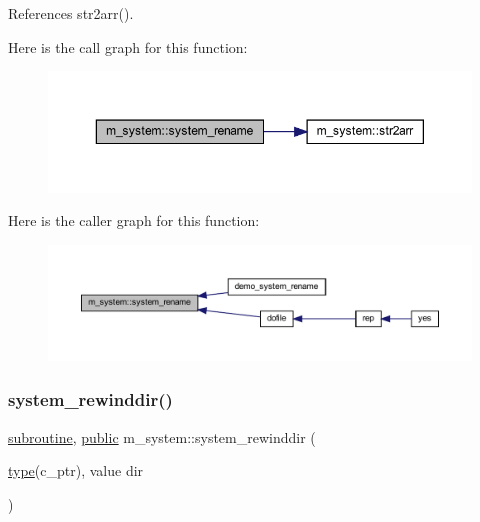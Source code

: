 References str2arr().

Here is the call graph for this function\+:
\nopagebreak
\begin{figure}[H]
\begin{center}
\leavevmode
\includegraphics[width=350pt]{namespacem__system_adfbaf3d17790da9ba0c520683d5b8003_cgraph}
\end{center}
\end{figure}
Here is the caller graph for this function\+:
\nopagebreak
\begin{figure}[H]
\begin{center}
\leavevmode
\includegraphics[width=350pt]{namespacem__system_adfbaf3d17790da9ba0c520683d5b8003_icgraph}
\end{center}
\end{figure}
\mbox{\label{namespacem__system_a3ffe757195ade8052e8acabd196ee3ca}} 
\subsubsection{\texorpdfstring{system\+\_\+rewinddir()}{system\_rewinddir()}}
{\footnotesize\ttfamily \hyperlink{M__stopwatch_83_8txt_acfbcff50169d691ff02d4a123ed70482}{subroutine}, \hyperlink{M__stopwatch_83_8txt_a2f74811300c361e53b430611a7d1769f}{public} m\+\_\+system\+::system\+\_\+rewinddir (\begin{DoxyParamCaption}\item[{\hyperlink{stop__watch_83_8txt_a70f0ead91c32e25323c03265aa302c1c}{type}(c\+\_\+ptr), value}]{dir }\end{DoxyParamCaption})}




